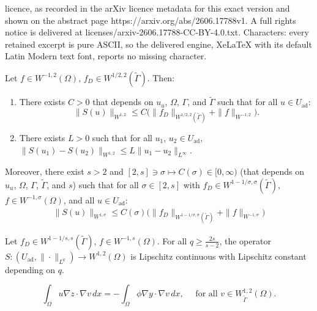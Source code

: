 \documentclass[10pt,a4paper]{amsart}
\newcommand{\feas}{U_{\textrm{ad}}}
\begin{document}
licence, as recorded in the arXiv licence metadata for this exact version and shown on the abstract page https://arxiv.org/abs/2606.17788v1. A full rights notice is delivered at licenses/arxiv-2606.17788-CC-BY-4.0.txt. Characters: every retained excerpt is pure ASCII, so the delivered engine, XeLaTeX with its default Latin Modern text font, reports no missing character.
\begin{proposition}\label{prp-new:elementary_properties}
Let $f\in W^{-1,2}(\Omega)$, $f_D\in W^{1/2,2}(\tilde\Gamma)$. Then:
%
\begin{enumerate}
\item There exists $C>0$ that depends on $u_u$, $\Omega$,
$\Gamma$, and $\tilde{\Gamma}$ such that for all $u \in \feas$:
\[
\|S(u)\|_{W^{1,2}} \le C\bigl(\|f_D\|_{W^{1/2,2}(\tilde\Gamma)} + 
\|f\|_{W^{-1,2}}\bigr).
\]
\item There exists $L>0$ such that for all $u_1$, $u_2 \in \feas,$ $\|S(u_1)-S(u_2)\|_{W^{1,2}} \le L\|u_1-u_2\|_{L^\infty}. $\end{enumerate}
%
Moreover, there exist $s>2$ and $[2,s] \ni \sigma \mapsto C(\sigma) \in [0,\infty)$ (that depends on $u_u$, $\Omega$, $\Gamma$, $\tilde{\Gamma}$, and $s$)
such that for all $\sigma \in [2,s]$ with $f_D\in W^{1-1/\sigma,\sigma}(\tilde\Gamma)$, $f \in W^{-1,\sigma}(\Omega)$, and all $u \in \feas$:
%
\begin{gather}\label{eq:w1s_estimate}
    \|S(u)\|_{W^{1,\sigma}}
\le C(\sigma)\bigl(\|f_D\|_{W^{1-1/\sigma,\sigma}(\tilde{\Gamma})} + \|f\|_{W^{-1,\sigma}}\bigr)
\end{gather}
\end{proposition}

\begin{lemma}\label{lem:S_Lipschitz}
Let $f_D\in W^{1-1/s,s}(\tilde\Gamma)$,
$f \in W^{-1,s}(\Omega)$.
For all $q \ge \frac{2s}{s-2}$, the operator
$
S : (\feas,\|\cdot\|_{L^{q}}) \to W^{1,2}(\Omega)
$
is Lipschitz continuous with Lipschitz constant depending on $q$.
\end{lemma}

\begin{equation}\label{eq:def_z_u_phi}
\int_\Omega u \nabla z \cdot \nabla v \, dx
=
-\int_\Omega \phi \nabla y \cdot \nabla v \, dx, \quad\text{ for all }v \in W^{1,2}_{\tilde\Gamma}(\Omega).
\end{equation}
\end{document}
